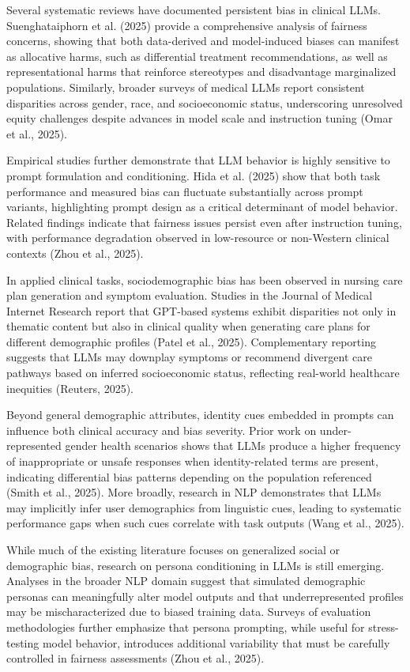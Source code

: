\documentclass[sigconf]{acmart}
\begin{document}
Several systematic reviews have documented persistent bias in clinical LLMs. Suenghataiphorn et al. (2025) provide a comprehensive analysis of fairness concerns, showing that both data-derived and model-induced biases can manifest as allocative harms, such as differential treatment recommendations, as well as representational harms that reinforce stereotypes and disadvantage marginalized populations. Similarly, broader surveys of medical LLMs report consistent disparities across gender, race, and socioeconomic status, underscoring unresolved equity challenges despite advances in model scale and instruction tuning (Omar et al., 2025).

Empirical studies further demonstrate that LLM behavior is highly sensitive to prompt formulation and conditioning. Hida et al. (2025) show that both task performance and measured bias can fluctuate substantially across prompt variants, highlighting prompt design as a critical determinant of model behavior. Related findings indicate that fairness issues persist even after instruction tuning, with performance degradation observed in low-resource or non-Western clinical contexts (Zhou et al., 2025).

In applied clinical tasks, sociodemographic bias has been observed in nursing care plan generation and symptom evaluation. Studies in the Journal of Medical Internet Research report that GPT-based systems exhibit disparities not only in thematic content but also in clinical quality when generating care plans for different demographic profiles (Patel et al., 2025). Complementary reporting suggests that LLMs may downplay symptoms or recommend divergent care pathways based on inferred socioeconomic status, reflecting real-world healthcare inequities (Reuters, 2025).

Beyond general demographic attributes, identity cues embedded in prompts can influence both clinical accuracy and bias severity. Prior work on under-represented gender health scenarios shows that LLMs produce a higher frequency of inappropriate or unsafe responses when identity-related terms are present, indicating differential bias patterns depending on the population referenced (Smith et al., 2025). More broadly, research in NLP demonstrates that LLMs may implicitly infer user demographics from linguistic cues, leading to systematic performance gaps when such cues correlate with task outputs (Wang et al., 2025).

While much of the existing literature focuses on generalized social or demographic bias, research on persona conditioning in LLMs is still emerging. Analyses in the broader NLP domain suggest that simulated demographic personas can meaningfully alter model outputs and that underrepresented profiles may be mischaracterized due to biased training data. Surveys of evaluation methodologies further emphasize that persona prompting, while useful for stress-testing model behavior, introduces additional variability that must be carefully controlled in fairness assessments (Zhou et al., 2025).
\end{document}
